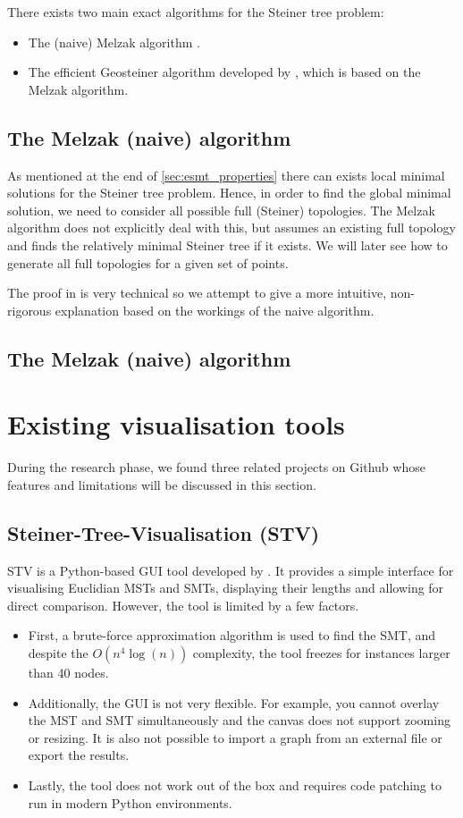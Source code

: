 \documentclass{l4proj}
\begin{document}
There exists two main exact algorithms for the Steiner tree problem:
\begin{itemize}
    \item The (naive) Melzak algorithm \cite{MelzakAlgo}.
    \item The efficient Geosteiner algorithm developed by \cite{geosteiner96}, which is based on the Melzak algorithm.
\end{itemize}

\subsection{The Melzak (naive) algorithm}
As mentioned at the end of \ref{sec:esmt_properties} there can exists local minimal solutions for the Steiner tree problem. Hence, in order to find the global minimal solution, we need to consider all possible full (Steiner) topologies. The Melzak algorithm does not explicitly deal with this, but assumes an existing full topology and finds the relatively minimal Steiner tree if it exists. We will later see how to generate all full topologies for a given set of points.



The proof in \citep{Garey1977} is very technical so we attempt to give a more intuitive, non-rigorous explanation based on the workings of the naive algorithm.
\subsection{The Melzak (naive) algorithm}

\section{Existing visualisation tools}

During the research phase, we found three related projects on Github whose features and limitations will be discussed in this section.

\subsection{Steiner-Tree-Visualisation (STV)}
STV is a Python-based GUI tool developed by \cite{Steiner-Tree-Visualisation}. It provides a simple interface for visualising Euclidian MSTs and SMTs, displaying their lengths and allowing for direct comparison. However, the tool is limited by a few factors.
\begin{itemize}
    \item First, a brute-force approximation algorithm is used to find the SMT, and despite the ${O(n^4 \log(n))}$ complexity, the tool freezes for instances larger than 40 nodes.
    \item Additionally, the GUI is not very flexible. For example, you cannot overlay the MST and SMT simultaneously and the canvas does not support zooming or resizing. It is also not possible to import a graph from an external file or export the results.
    \item Lastly, the tool does not work out of the box and requires code patching to run in modern Python environments.
\end{itemize}
\end{document}
